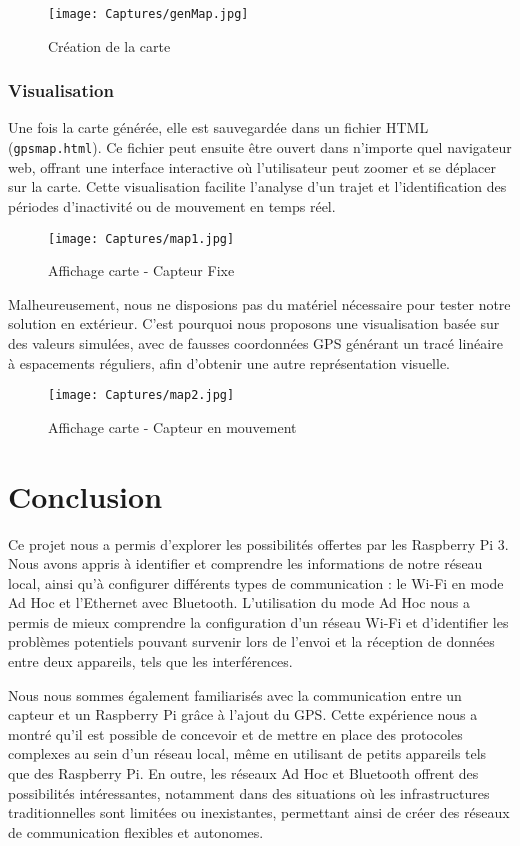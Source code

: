\documentclass[a4paper,11pt]{article}
\begin{document}
\begin{figure}[H]
    \centering
    \texttt{[image: Captures/genMap.jpg]}
    \caption{Création de la carte}
    \label{fig:enter-label}
\end{figure}

\subsubsection{Visualisation}
Une fois la carte générée, elle est sauvegardée dans un fichier HTML (\texttt{gpsmap.html}). Ce fichier peut ensuite être ouvert dans n’importe quel navigateur web, offrant une interface interactive où l’utilisateur peut zoomer et se déplacer sur la carte. Cette visualisation facilite l’analyse d'un trajet et l’identification des périodes d’inactivité ou de mouvement en temps réel.

\begin{figure}[H]
    \centering
    \texttt{[image: Captures/map1.jpg]}
    \caption{Affichage carte - Capteur Fixe}
    \label{fig:enter-label}
\end{figure}

Malheureusement, nous ne disposions pas du matériel nécessaire pour tester notre solution en extérieur. C'est pourquoi nous proposons une visualisation basée sur des valeurs simulées, avec de fausses coordonnées GPS générant un tracé linéaire à espacements réguliers, afin d'obtenir une autre représentation visuelle.

\begin{figure}[H]
    \centering
    \texttt{[image: Captures/map2.jpg]}
    \caption{Affichage carte - Capteur en mouvement}
    \label{fig:enter-label}
\end{figure}


\section{Conclusion}

Ce projet nous a permis d’explorer les possibilités offertes par les Raspberry Pi 3. Nous avons appris à identifier et comprendre les informations de notre réseau local, ainsi qu’à configurer différents types de communication : le Wi-Fi en mode Ad Hoc et l’Ethernet avec Bluetooth. L’utilisation du mode Ad Hoc nous a permis de mieux comprendre la configuration d’un réseau Wi-Fi et d'identifier les problèmes potentiels pouvant survenir lors de l’envoi et la réception de données entre deux appareils, tels que les interférences.

Nous nous sommes également familiarisés avec la communication entre un capteur et un Raspberry Pi grâce à l’ajout du GPS. Cette expérience nous a montré qu’il est possible de concevoir et de mettre en place des protocoles complexes au sein d’un réseau local, même en utilisant de petits appareils tels que des Raspberry Pi. En outre, les réseaux Ad Hoc et Bluetooth offrent des possibilités intéressantes, notamment dans des situations où les infrastructures traditionnelles sont limitées ou inexistantes, permettant ainsi de créer des réseaux de communication flexibles et autonomes.
\end{document}
